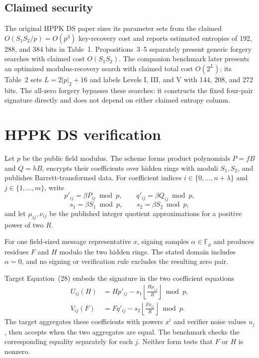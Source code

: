 \documentclass[10pt,a4paper]{article}
\newcommand{\Fp}{\mathbb{F}_p}
\begin{document}
\subsection{Claimed security}

The original HPPK DS paper sizes its parameter sets from the claimed
$O(S_1S_2/p)=O(p^3)$ key-recovery cost and reports estimated entropies of 192,
288, and 384 bits in Table~1. Propositions~3--5 separately present generic
forgery searches with claimed cost $O(S_1S_2)$. The companion benchmark later
presents an optimized modulus-recovery search with claimed total cost
$O(2^L)$; its Table~2 sets $L=2\lvert p\rvert_2+16$ and labels Levels I, III,
and V with 144, 208, and 272 bits. The all-zero forgery bypasses these searches:
it constructs the fixed four-pair signature directly and does not depend on
either claimed entropy column.

\section{HPPK DS verification}

Let $p$ be the public field modulus. The scheme forms product polynomials
$P=fB$ and $Q=hB$, encrypts their coefficients over hidden rings with moduli
$S_1,S_2$, and publishes Barrett-transformed data. For coefficient indices
$i\in\{0,\ldots,n+\lambda\}$ and $j\in\{1,\ldots,m\}$, write
\[
 p'_{ij}=\beta P_{ij}\bmod p,\qquad
 q'_{ij}=\beta Q_{ij}\bmod p,
\]
\[
 s_1=\beta S_1\bmod p,\qquad s_2=\beta S_2\bmod p,
\]
and let $\mu_{ij},\nu_{ij}$ be the published integer quotient
approximations for a positive power of two $R$.

For one field-sized message representative $x$, signing samples
$\alpha\in\Fp$ and produces residues $F$ and $H$ modulo the two hidden rings.
The stated domain includes $\alpha=0$, and no signing or verification rule
excludes the resulting zero pair.

Target Equation~(28) embeds the signature in the two coefficient equations
\begin{align}
 U_{ij}(H) &= H p'_{ij}
  -s_1\left\lfloor\frac{H\mu_{ij}}{R}\right\rfloor \bmod p,
  \label{eq:u-coefficient}\\
 V_{ij}(F) &= F q'_{ij}
  -s_2\left\lfloor\frac{F\nu_{ij}}{R}\right\rfloor \bmod p.
  \label{eq:v-coefficient}
\end{align}
The target aggregates these coefficients with powers $x^i$ and verifier noise
values $u_j$, then accepts when the two aggregates are equal. The benchmark
checks the corresponding equality separately for each $j$. Neither form tests
that $F$ or $H$ is nonzero.
\end{document}
